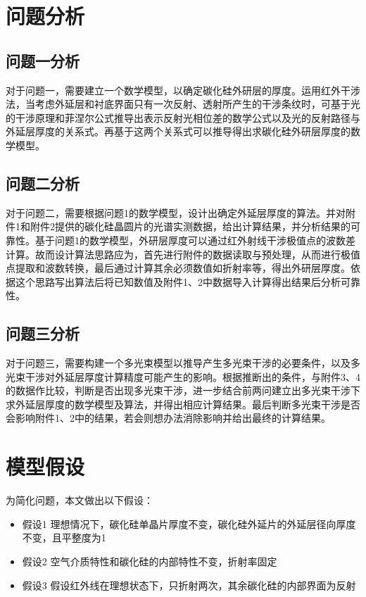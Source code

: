 \documentclass[withoutpreface,bwprint]{cumcmthesis}
\begin{document}

\section{问题分析}
\subsection{问题一分析}
对于问题一，需要建立一个数学模型，以确定碳化硅外研层的厚度。运用红外干涉法，当考虑外延层和衬底界面只有一次反射、透射所产生的干涉条纹时，可基于光的干涉原理和菲涅尔公式推导出表示反射光相位差的数学公式以及光的反射路径与外延层厚度的关系式。再基于这两个关系式可以推导得出求碳化硅外研层厚度的数学模型。
\subsection{问题二分析}	
对于问题二，需要根据问题1的数学模型，设计出确定外延层厚度的算法。并对附件1和附件2提供的碳化硅晶圆片的光谱实测数据，给出计算结果，并分析结果的可靠性。基于问题1的数学模型，外研层厚度可以通过红外射线干涉极值点的波数差计算。故而设计算法思路应为，首先进行附件的数据读取与预处理，从而进行极值点提取和波数转换，最后通过计算其余必须数值如折射率等，得出外研层厚度。依据这个思路写出算法后将已知数值及附件1、2中数据导入计算得出结果后分析可靠性。

\subsection{问题三分析}
对于问题三，需要构建一个多光束模型以推导产生多光束干涉的必要条件，以及多光束干涉对外延层厚度计算精度可能产生的影响。根据推断出的条件，与附件3、4的数据作比较，判断是否出现多光束干涉，进一步结合前两问建立出多光束干涉下求外延层厚度的数学模型及算法，并得出相应计算结果。最后判断多光束干涉是否会影响附件1、2中的结果，若会则想办法消除影响并给出最终的计算结果。


\section{模型假设}

为简化问题，本文做出以下假设：

\begin{itemize}[itemindent=2em]
\item 假设1 理想情况下，碳化硅单晶片厚度不变，碳化硅外延片的外延层径向厚度不变，且平整度为1
\item 假设2 空气介质特性和碳化硅的内部特性不变，折射率固定
\item 假设3 假设红外线在理想状态下，只折射两次，其余碳化硅的内部界面为反射
\end{itemize}
\end{document}
